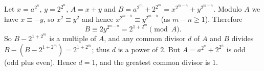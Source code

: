 Let $x=a^{2^n}$, $y=2^{2^n}$, $A=x+y$ and $B=a^{2^m}+2^{2^m}=x^{2^{m-n}}+y^{2^{m-n}}$. Modulo $A$ we have $x\equiv-y$, so $x^2\equiv y^2$ and hence $x^{2^{m-n}}\equiv y^{2^{m-n}}$ (as $m-n\ge1$). Therefore
\[
B\equiv2y^{2^{m-n}}=2^{1+2^m}\pmod A .
\]
So $B-2^{1+2^m}$ is a multiple of $A$, and any common divisor $d$ of $A$ and $B$ divides $B-\left(B-2^{1+2^m}\right)=2^{1+2^m}$; thus $d$ is a power of $2$. But $A=a^{2^n}+2^{2^n}$ is odd (odd plus even). Hence $d=1$, and the greatest common divisor is $\boxed{1}$.
